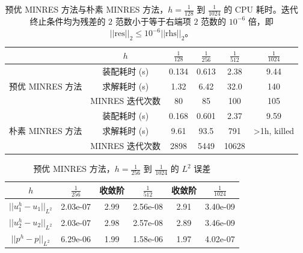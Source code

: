 \documentclass[lang=cn,11pt,a4paper]{elegantpaper}
\begin{document}
\begin{table}[H]
    \centering
    \begin{tabular}{c|ccccc}
    \hline
                                        & $h$               & $\frac{1}{128}$  & $\frac{1}{256}$ & $\frac{1}{512}$  & $\frac{1}{1024}$ \\ \hline
    \multirow{3}{*}{预优 MINRES 方法}    & 装配耗时 (s)     &   0.134   & 0.613            &   2.38   &  9.44              \\
                                        & 求解耗时 (s)       &   1.32   & 6.42            &   32.0   &  140              \\
                                        & MINRES 迭代次数        &   80   & 85             &   100   &  105             \\ \hline
    \multirow{3}{*}{朴素 MINRES 方法} & 装配耗时 (s)        &  0.168    & 0.601         &  2.37    &  9.59             \\
                                    & 求解耗时 (s)         &   9.61   &   93.5     &   791   &    >1h, killed   \\
                                    & MINRES 迭代次数          &   2898   &  5449     &   10628   &                \\ \hline
    \end{tabular}
    \caption{\small 预优 MINRES 方法与朴素 MINRES 方法，$h=\frac{1}{128}$ 到 $\frac{1}{1024}$ 的 CPU 耗时。迭代终止条件均为残差的 $2$ 范数小于等于右端项 $2$ 范数的 $10^{-6}$ 倍，即 $||\text{res}||_2\leq 10^{-6}||\text{rhs}||_2$。}
\end{table}

\begin{table}[H]
    \centering
    \begin{tabular}{cccccc}
    \hline
         $h$               & $\frac{1}{256}$ & 收敛阶  & $\frac{1}{512}$ & 收敛阶  & $\frac{1}{1024}$ \\ \hline
         $||u_1^h-u_1||_{L^2}$ & 2.03e-07        & 2.99 & 2.56e-08        & 2.91 & 3.40e-09         \\
         $||u_2^h-u_2||_{L^2}$ & 2.03e-07        & 2.98 & 2.57e-08        & 2.89 & 3.46e-09         \\
         $||p^h-p||_{L^2}$     & 6.29e-06        & 1.99 & 1.58e-06        & 1.97 & 4.02e-07         \\ \hline
    \end{tabular}
    \caption{\small 预优 MINRES 方法，$h=\frac{1}{256}$ 到 $\frac{1}{1024}$ 的 $L^2$ 误差}
\end{table}
\end{document}

